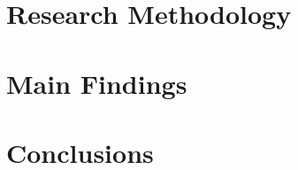 \documentclass{article}
\begin{document}
\section{Research Methodology}
\section{Main Findings}

\section{Conclusions}
\begin{figure}
\end{figure}
\printbibliography{}
\end{document}
